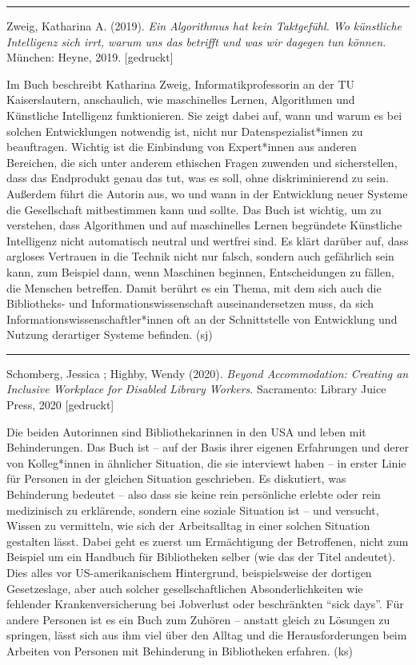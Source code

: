 \documentclass[a4paper,
fontsize=11pt,
oneside,
numbers=noperiodatend,
parskip=half-,
bibliography=totoc,
final
]{scrartcl}
\begin{document}
\begin{center}\rule{0.5\linewidth}{0.5pt}\end{center}
\pagebreak

Zweig, Katharina A. (2019). \emph{Ein Algorithmus hat kein Taktgefühl.
Wo künstliche Intelligenz sich irrt, warum uns das betrifft und was wir
dagegen tun können.} München: Heyne, 2019. {[}gedruckt{]}

Im Buch beschreibt Katharina Zweig, Informatikprofessorin an der TU
Kaiserslautern, anschaulich, wie maschinelles Lernen, Algorithmen und
Künstliche Intelligenz funktionieren. Sie zeigt dabei auf, wann und
warum es bei solchen Entwicklungen notwendig ist, nicht nur
Datenspezialist*innen zu beauftragen. Wichtig ist die Einbindung von
Expert*innen aus anderen Bereichen, die sich unter anderem ethischen
Fragen zuwenden und sicherstellen, dass das Endprodukt genau das tut,
was es soll, ohne diskriminierend zu sein. Außerdem führt die Autorin
aus, wo und wann in der Entwicklung neuer Systeme die Gesellschaft
mitbestimmen kann und sollte. Das Buch ist wichtig, um zu verstehen,
dass Algorithmen und auf maschinelles Lernen begründete Künstliche
Intelligenz nicht automatisch neutral und wertfrei sind. Es klärt
darüber auf, dass argloses Vertrauen in die Technik nicht nur falsch,
sondern auch gefährlich sein kann, zum Beispiel dann, wenn Maschinen
beginnen, Entscheidungen zu fällen, die Menschen betreffen. Damit
berührt es ein Thema, mit dem sich auch die Bibliotheks- und
Informationswissenschaft auseinandersetzen muss, da sich
Informationswissenschaftler*innen oft an der Schnittstelle von
Entwicklung und Nutzung derartiger Systeme befinden. (sj)

\begin{center}\rule{0.5\linewidth}{0.5pt}\end{center}

Schomberg, Jessica ; Highby, Wendy (2020). \emph{Beyond Accommodation:
Creating an Inclusive Workplace for Disabled Library Workers}.
Sacramento: Library Juice Press, 2020 {[}gedruckt{]}

Die beiden Autorinnen sind Bibliothekarinnen in den USA und leben mit
Behinderungen. Das Buch ist -- auf der Basis ihrer eigenen Erfahrungen
und derer von Kolleg*innen in ähnlicher Situation, die sie interviewt
haben -- in erster Linie für Personen in der gleichen Situation
geschrieben. Es diskutiert, was Behinderung bedeutet -- also dass sie
keine rein persönliche erlebte oder rein medizinisch zu erklärende,
sondern eine soziale Situation ist -- und versucht, Wissen zu
vermitteln, wie sich der Arbeitsalltag in einer solchen Situation
gestalten lässt. Dabei geht es zuerst um Ermächtigung der Betroffenen,
nicht zum Beispiel um ein Handbuch für Bibliotheken selber (wie das der
Titel andeutet). Dies alles vor US-amerikanischem Hintergrund,
beispielsweise der dortigen Gesetzeslage, aber auch solcher
gesellschaftlichen Absonderlichkeiten wie fehlender Krankenversicherung
bei Jobverlust oder beschränkten \enquote{sick days}. Für andere
Personen ist es ein Buch zum Zuhören -- anstatt gleich zu Lösungen zu
springen, lässt sich aus ihm viel über den Alltag und die
Herausforderungen beim Arbeiten von Personen mit Behinderung in
Bibliotheken erfahren. (ks)
\end{document}

